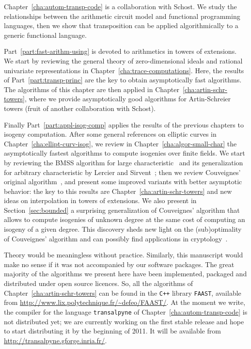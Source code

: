 Chapter~\ref{cha:autom-transp-code} is a collaboration with Schost. We
study the relationships between the arithmetic circuit model and
functional programming languages, then we show that transposition can
be applied algorithmically to a generic functional language. 

Part~\ref{part:fast-arithm-using} is devoted to arithmetics in towers
of extensions. We start by reviewing the general theory of
zero-dimensional ideals and rational univariate representations in
Chapter~\ref{cha:trace-computations}. Here, the results of
Part~\ref{part:transp-princ} are the key to obtain asymptotically fast
algorithms. The algorithms of this chapter are then applied in
Chapter~\ref{cha:artin-schr-towers}, where we provide asymptotically
good algorithms for Artin-Schreier towers (fruit of another
collaboration with Schost).

Finally Part~\ref{part:appl-isog-comp} applies the results of the
previous chapters to isogeny computation. After some general
references on elliptic curves in Chapter~\ref{cha:ellipt-curv-isog},
we review in Chapter~\ref{cha:algor-small-char} the asymptotically
fastest algorithms to compute isogenies over finite fields.  We start
by reviewing the BMSS algorithm for large
characteristic~\cite{bostan+morain+salvy+schost08} and its
generalization for arbitrary characteristic by Lercier and
Sirvent~\cite{lercier+sirvent08}; then we review Couveignes' original
algorithm~\cite{couveignes96}, and present some improved variants with
better asymptotic behavior: the key to this results are
Chapter~\ref{cha:artin-schr-towers} and new ideas on interpolation in
towers of extensions.  We also present in Section~\ref{sec:bounded} a
surprising generalization of Couveignes' algorithm that allows to
compute isogenies of unknown degree at the same cost of computing an
isogeny of a given degree.  This discovery sheds new light on the
(sub)optimality of Couveignes' algorithm and can possibly find
applications in
cryptology~\cite{gaudry+hess+smart02,GHS,hess03,teske06}.

Theory would be meaningless without practice. Similarly, this
manuscript would make no sense if it was not accompanied by our
software packages. The great majority of the algorithms we present
here have been implemented, packaged and distributed under open source
licences. So, all the algorithms of
Chapter~\ref{cha:artin-schr-towers} can be found in the \texttt{C++}
library \texttt{FAAST}, available from
\url{http://www.lix.polytechnique.fr/~defeo/FAAST/}. At the
moment we write, the compiler for the language \texttt{transalpyne} of
Chapter~\ref{cha:autom-transp-code} is not distributed yet; we are
currently working on the first stable release and hope to start
distributing it by the beginning of 2011. It will be available from
\url{ http://transalpyne.gforge.inria.fr/}.




